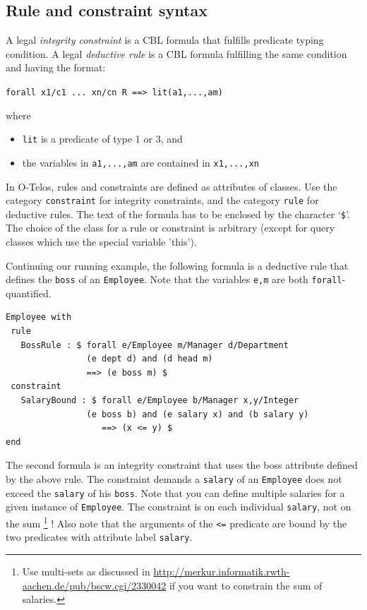 \subsection{Rule and constraint syntax}
\label{sec:rulesyntax}
A legal {\em integrity constraint\/} is a CBL formula that fulfills predicate typing
condition. A legal {\em deductive rule\/} is a CBL
formula fulfilling the same condition and having the format:

{\tt forall x1/c1 ... xn/cn R ==> lit(a1,...,am)}

where
\begin{itemize}
\item {\tt lit} is a predicate of type 1 or 3, and
\item the variables in {\tt a1,...,am} are contained in {\tt x1,...,xn}
\end{itemize}

In O-Telos, rules and constraints are defined as attributes of classes. Use
the category {\tt constraint} for integrity constraints, and the
category {\tt rule} for deductive rules. The text of the formula has
to be enclosed by the character `{\tt \$}'.
The choice of the class for a rule or constraint is arbitrary (except
for query classes which use the special variable 'this').

Continuing our running example, the following formula is a deductive rule
that defines the {\tt boss} of an {\tt Employee}. Note that the variables
{\tt e,m} are both {\tt forall}-quantified.

\begin{verbatim}
Employee with
 rule
   BossRule : $ forall e/Employee m/Manager d/Department
                (e dept d) and (d head m)
                ==> (e boss m) $
 constraint
   SalaryBound : $ forall e/Employee b/Manager x,y/Integer
                (e boss b) and (e salary x) and (b salary y)
                   ==> (x <= y) $
end
\end{verbatim}

The second formula is an integrity constraint that uses the boss attribute
defined by the above rule. The constraint demands a {\tt salary} of an
{\tt Employee} does not exceed the {\tt salary} of his {\tt boss}. 
Note that you can define multiple  salaries for a given instance of
{\tt Employee}. The constraint is on each individual {\tt salary}, not
on the sum%
\footnote{Use multi-sets as discussed in
\url{http://merkur.informatik.rwth-aachen.de/pub/bscw.cgi/2330042} if
you want to constrain the sum of salaries.}%
! Also note that the arguments of the {\tt <=} predicate  are
bound by the two predicates with attribute label {\tt salary}.

